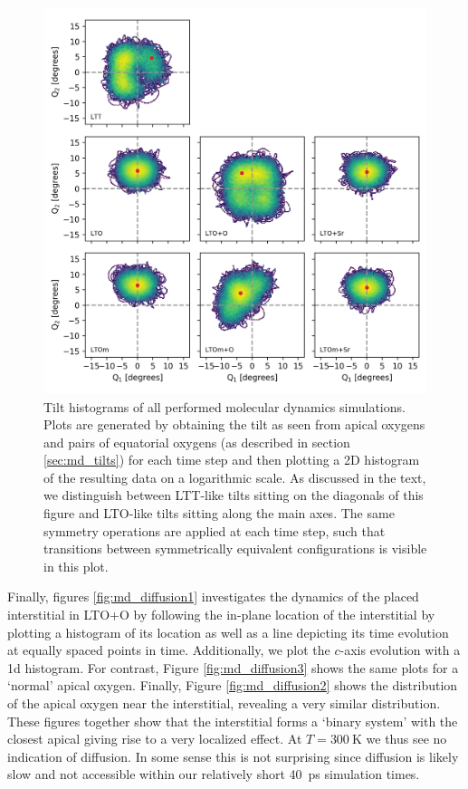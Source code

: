 \begin{figure}
	\centering
	\includegraphics[width=\textwidth]{fig/md/Q1_Q2_all.png}
	\caption[MD Q1 Q2 All sims]{Tilt histograms of all performed molecular dynamics simulations. Plots are generated by obtaining the tilt as seen from apical oxygens and pairs of equatorial oxygens (as described in section \ref{sec:md_tilts}) for each time step and then plotting a 2D histogram of the resulting data on a logarithmic scale. As discussed in the text, we distinguish between LTT-like tilts sitting on the diagonals of this figure and LTO-like tilts sitting along the main axes. The same symmetry operations are applied at each time step, such that transitions between symmetrically equivalent configurations is visible in this plot.}
	\label{fig:md_q1_q2_all}
\end{figure}

Finally, figures \ref{fig:md_diffusion1} investigates the dynamics of the placed interstitial in LTO+O by following the in-plane location of the interstitial by plotting a histogram of its location as well as a line depicting its time evolution at equally spaced points in time. Additionally, we plot the $c$-axis evolution with a 1d histogram. For contrast, Figure \ref{fig:md_diffusion3} shows the same plots for a `normal' apical oxygen. Finally, Figure \ref{fig:md_diffusion2} shows the distribution of the apical oxygen near the interstitial, revealing a very similar distribution. These figures together show that the interstitial forms a `binary system' with the closest apical giving rise to a very localized effect. At $T=\SI{300}{\kelvin}$ we thus see no indication of diffusion. In some sense this is not surprising since diffusion is likely slow and not accessible within our relatively short \SI{40}{\pico\second} simulation times.

